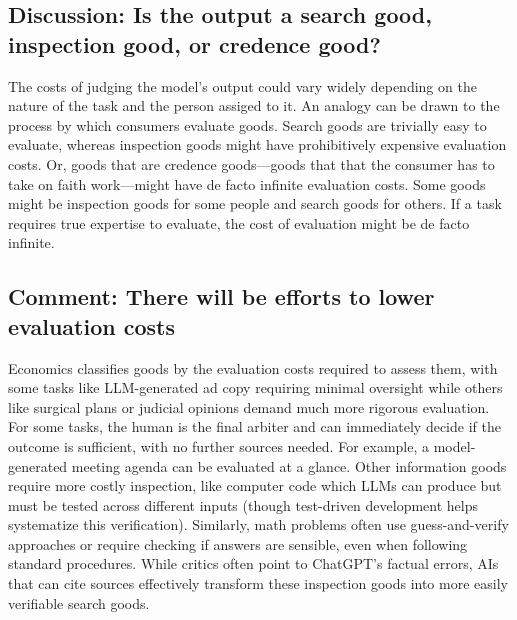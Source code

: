 \documentclass{article}
\begin{document}
\begin{tcolorbox}
\subsection{Discussion: Is the output a search good, inspection good, or credence good?}
The costs of judging the model's output could vary widely depending on the nature of the task and the person assiged to it.
An analogy can be drawn to the process by which consumers evaluate goods. 
Search goods are trivially easy to evaluate, whereas inspection goods might have prohibitively expensive evaluation costs. 
Or, goods that are credence goods---goods that that the consumer has to take on faith work---might have de facto infinite evaluation costs.
Some goods might be inspection goods for some people and search goods for others. 
If a task requires true expertise to evaluate, the cost of evaluation might be de facto infinite.
\end{tcolorbox}

\begin{tcolorbox}
\subsection{Comment: There will be efforts to lower evaluation costs}
Economics classifies goods by the evaluation costs required to assess them, with some tasks like LLM-generated ad copy requiring minimal oversight while others like surgical plans or judicial opinions demand much more rigorous evaluation.
For some tasks, the human is the final arbiter and can immediately decide if the outcome is sufficient, with no further sources needed. 
For example, a model-generated meeting agenda can be evaluated at a glance. 
Other information goods require more costly inspection, like computer code which LLMs can produce but must be tested across different inputs (though test-driven development helps systematize this verification). 
Similarly, math problems often use guess-and-verify approaches or require checking if answers are sensible, even when following standard procedures. 
While critics often point to ChatGPT's factual errors, AIs that can cite sources effectively transform these inspection goods into more easily verifiable search goods.
\end{tcolorbox}
\end{document}
